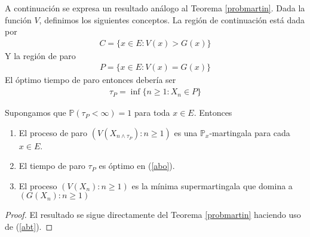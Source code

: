 A continuación se expresa un resultado análogo al Teorema \ref{probmartin}. Dada la función $V$, definimos los siguientes conceptos. La región de continuación está dada por
	\begin{align*}
	C = \{x \in E : V(x) > G(x)\}
	\end{align*}
Y la región de paro
	\begin{align*}
	P = \{x \in E : V(x) = G(x)\}
	\end{align*}
El óptimo tiempo de paro entonces debería ser
	\begin{align*}
	\tau_P = \inf \{n \geq 1 : X_n \in P\}
	\end{align*}

\begin{theorem}
Supongamos que $\mathbb{P} (\tau_P < \infty) = 1$ para toda $x \in E$. Entonces
	\begin{enumerate}
	\item El proceso de paro $(V(X_{n \wedge \tau_P}) : n \geq 1)$ es una $\mathbb{P}_x$-martingala para cada $x \in E$.
	\item El tiempo de paro $\tau_P$ es óptimo en (\ref{abo}).
	\item El proceso $(V(X_n) : n \geq 1)$ es la mínima supermartingala que domina a $(G(X_n) : n \geq 1)$
	\end{enumerate}
\end{theorem}
\begin{proof}
El resultado se sigue directamente del Teorema \ref{probmartin} haciendo uso de (\ref{abt}).
\end{proof}